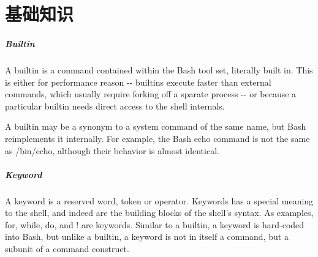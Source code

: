 \chapter{基础知识}

\paragraph{Builtin}
A builtin is a command contained within the Bash tool set, literally built in. This is either for performance reason -{}- builtins execute faster than external commands, which usually require forking off a sparate process -{}- or because a particular builtin needs direct access to the shell internals.

A builtin may be a synonym to a system command of the same name, but Bash reimplements it internally. For example, the Bash echo command is not the same as  /bin/echo, although their behavior is almost identical.

\paragraph{Keyword}
A keyword is a reserved word, token or operator. Keywords has a special meaning to the shell, and indeed are the building blocks of the shell's syntax. As examples, for, while, do, and ! are keywords. Similar to a builtin, a keyword is hard-coded into Bash, but unlike a builtin, a keyword is not in itself a command, but a subunit of a command construct.